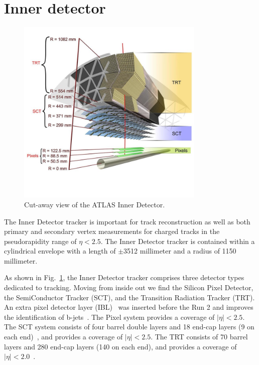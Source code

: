 \section{Inner detector}
\label{sec:inner}

\begin{figure}[htbp]
    \centering
    \includegraphics[width=0.8\textwidth]{chapters/c4/figures/inner}
    \caption{Cut-away view of the ATLAS Inner Detector.}
    \label{fig:inner}
\end{figure}

\par The Inner Detector tracker is important for track reconstruction as well as both primary and secondary vertex measurements for charged tracks in the pseudorapidity range of $ \eta< 2.5$. The Inner Detector tracker is contained within a cylindrical envelope with a length of $\pm$3512 millimeter and a radius of 1150 millimeter.

\par As shown in Fig.~\ref{fig:inner}, the Inner Detector tracker comprises three detector types dedicated to tracking. Moving from inside out we find the Silicon Pixel Detector, the SemiConductor Tracker (SCT), and the Transition Radiation Tracker (TRT). An extra pixel detector layer (IBL)~\cite{Capeans:1291633} was inserted before the Run 2 and improves the identification of b-jets~\cite{ATL-PHYS-PUB-2015-022}. The Pixel system provides a coverage of $|\eta|<2.5$. The SCT system consists of four barrel double layers and 18 end-cap layers (9 on each end)~\cite{Aad:2014mta}, and provides a coverage of $|\eta| < 2.5$. The TRT consists of 70 barrel layers and 280 end-cap layers (140 on each end), and provides a coverage of $|\eta| < 2.0$~\cite{Aad:2014mta}.

